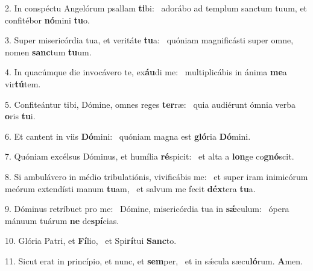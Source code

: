 2. In conspéctu Angelórum psallam \textbf{ti}bi: \ast\  adorábo ad templum sanctum tuum, et confitébor \textbf{nó}mini \textbf{tu}o.\

3. Super misericórdia tua, et veritáte \textbf{tu}a: \ast\  quóniam magnificásti super omne, nomen \textbf{sanc}tum \textbf{tu}um.\

4. In quacúmque die invocávero te, ex\textbf{áu}di me: \ast\  multiplicábis in ánima \textbf{me}a vir\textbf{tú}tem.\

5. Confiteántur tibi, Dómine, omnes reges \textbf{ter}ræ: \ast\  quia audiérunt ómnia verba \textbf{o}ris \textbf{tu}i.\

6. Et cantent in viis \textbf{Dó}mini: \ast\  quóniam magna est \textbf{gló}ria \textbf{Dó}mini.\

7. Quóniam excélsus Dóminus, et humília \textbf{ré}spicit: \ast\  et alta a \textbf{lon}ge co\textbf{gnó}scit.\

8. Si ambulávero in médio tribulatiónis, vivificábis me: \dag\  et super iram inimicórum meórum extendísti manum \textbf{tu}am, \ast\  et salvum me fecit \textbf{déx}tera \textbf{tu}a.\

9. Dóminus retríbuet pro me: \dag\  Dómine, misericórdia tua in \textbf{sǽ}culum: \ast\  ópera mánuum tuárum \textbf{ne} de\textbf{spí}cias.\

10. Glória Patri, et \textbf{Fí}lio, \ast\  et Spi\textbf{rí}tui \textbf{Sanc}to.\

11. Sicut erat in princípio, et nunc, et \textbf{sem}per, \ast\  et in sǽcula sæcu\textbf{ló}rum. \textbf{A}men.\

